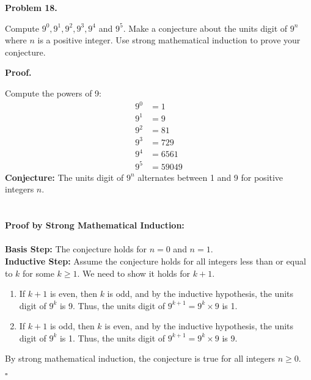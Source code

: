 \documentclass{article}
\newenvironment{problem}[1]{
    \begin{mdframed}[backgroundcolor=gray!20, skipabove=\baselineskip, skipbelow=\baselineskip, nobreak=true, innerleftmargin=10pt, innerrightmargin=10pt, innertopmargin=10pt, innerbottommargin=10pt]
    \textbf{Problem #1.}
}{
    \end{mdframed}
}
\newenvironment{proof}{
    \begin{mdframed}[nobreak=false, innerleftmargin=10pt, innerrightmargin=10pt, innertopmargin=10pt, innerbottommargin=10pt]
    \textbf{Proof.}
}{
    \hfill $\square$
    \end{mdframed}
}
\begin{document}
    \begin{problem}{18}
        Compute $9^0, 9^1, 9^2, 9^3, 9^4$ and $9^5$. Make a conjecture about the units digit of $9^n$ where $n$ is a positive integer. Use strong mathematical induction to prove your conjecture.
    \end{problem}
    \begin{proof}
        Compute the powers of 9:
        \begin{align*}
            9^0 &= 1 \\
            9^1 &= 9 \\
            9^2 &= 81 \\
            9^3 &= 729 \\
            9^4 &= 6561 \\
            9^5 &= 59049
        \end{align*}
        \textbf{Conjecture:}
        The units digit of $9^n$ alternates between 1 and 9 for positive integers $n$. \\ \\ \\
        \textbf{Proof by Strong Mathematical Induction:} \\ \\
        \textbf{Basis Step:}
            The conjecture holds for $n = 0$ and $n = 1$. \\
        \textbf{Inductive Step:}
            Assume the conjecture holds for all integers less than or equal to $k$ for some $k \geq 1$. We need to show it holds for $k+1$.
            \begin{enumerate}
                \item If $k+1$ is even, then $k$ is odd, and by the inductive hypothesis, the units digit of $9^k$ is 9. Thus, the units digit of $9^{k+1} = 9^k \times 9$ is 1.
                \item If $k+1$ is odd, then $k$ is even, and by the inductive hypothesis, the units digit of $9^k$ is 1. Thus, the units digit of $9^{k+1} = 9^k \times 9$ is 9.
            \end{enumerate}
        By strong mathematical induction, the conjecture is true for all integers $n \geq 0$.
    \end{proof}
\end{document}
